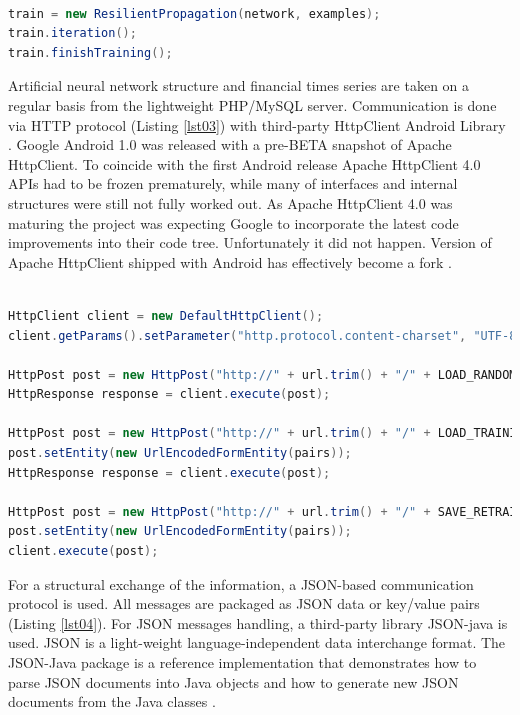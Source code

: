 \documentclass[a4paper,conference]{IEEEtran}
\begin{document}
\begin{lstlisting}[caption=Resilient backpropagation training, language=Java, basicstyle=\tiny, label=lst07]

train = new ResilientPropagation(network, examples);
train.iteration();
train.finishTraining();

\end{lstlisting}

Artificial neural network structure and financial times series are taken on a regular basis from the lightweight PHP/MySQL server. Communication is done via HTTP protocol (Listing \ref{lst03}) with third-party HttpClient Android Library \cite{Sebera-01}. Google Android 1.0 was released with a pre-BETA snapshot of Apache HttpClient. To coincide with the first Android release Apache HttpClient 4.0 APIs had to be frozen prematurely, while many of interfaces and internal structures were still not fully worked out. As Apache HttpClient 4.0 was maturing the project was expecting Google to incorporate the latest code improvements into their code tree. Unfortunately it did not happen. Version of Apache HttpClient shipped with Android has effectively become a fork \cite{Apache-01}.

\begin{lstlisting}[caption=HTTP communication, language=Java, basicstyle=\tiny, label=lst03]

HttpClient client = new DefaultHttpClient();
client.getParams().setParameter("http.protocol.content-charset", "UTF-8");

HttpPost post = new HttpPost("http://" + url.trim() + "/" + LOAD_RANDOM_ANN_SCRIPT);
HttpResponse response = client.execute(post);

HttpPost post = new HttpPost("http://" + url.trim() + "/" + LOAD_TRAINING_SET_SCRIPT);
post.setEntity(new UrlEncodedFormEntity(pairs));
HttpResponse response = client.execute(post);

HttpPost post = new HttpPost("http://" + url.trim() + "/" + SAVE_RETRAINED_ANN_SCRIPT);
post.setEntity(new UrlEncodedFormEntity(pairs));
client.execute(post);

\end{lstlisting}

For a structural exchange of the information, a JSON-based communication protocol is used. All messages are packaged as JSON data or key/value pairs (Listing \ref{lst04}). For JSON messages handling, a third-party library JSON-java is used. JSON is a light-weight language-independent data interchange format. The JSON-Java package is a reference implementation that demonstrates how to parse JSON documents into Java objects and how to generate new JSON documents from the Java classes \cite{Leary-01}.
\end{document}

